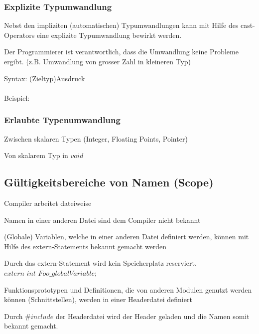 				\begin{minipage}[t]{9 cm}
					\subsubsection{Explizite Typumwandlung}
						\begin{compactitem}
							\item Nebst den impliziten (automatischen) Typumwandlungen kann mit Hilfe des
							cast-Operators eine explizite Typumwandlung bewirkt werden.
							\item Der Programmierer ist verantwortlich, dass die Umwandlung keine Probleme
							ergibt.
							(z.B. Umwandlung von grosser Zahl in kleineren Typ)
							\item Syntax:
							(Zieltyp)Ausdruck
							\\\\Beispiel:
							
						\end{compactitem}
					\subsubsection{Erlaubte Typenumwandlung}
						\begin{compactitem}
							\item Zwischen skalaren Typen (Integer, Floating Points, Pointer)
							\item Von skalarem Typ in $void$
						\end{compactitem}
				\end{minipage}
			\subsection{Gültigkeitsbereiche von Namen (Scope)}				
				\begin{compactitem}
					\item Compiler arbeitet dateiweise
					\item Namen in einer anderen Datei sind dem Compiler nicht bekannt
					\item (Globale) Variablen, welche in einer anderen Datei definiert werden, können 
					mit Hilfe des extern-Statements bekannt gemacht werden
					\item Durch das extern-Statement wird kein Speicherplatz reserviert.\\
					$extern$ $int$ $Foo\_globalVariable$;
					\item Funktionsprototypen und Definitionen, die von anderen Modulen genutzt
					werden können (Schnittstellen), werden in einer Headerdatei definiert
					\item Durch $\#include$ der Headerdatei wird der Header geladen und die Namen somit bekannt gemacht.
				\end{compactitem}